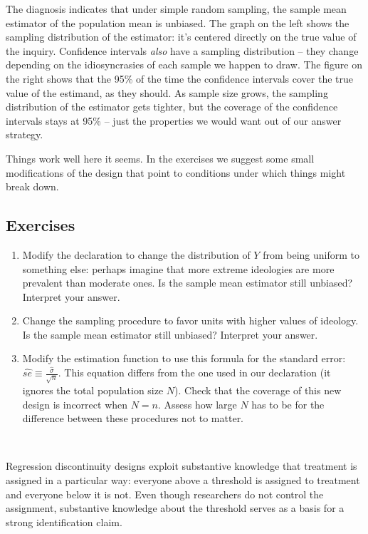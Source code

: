 \documentclass[11pt]{article}\usepackage[]{graphicx}\usepackage[]{color}
\begin{document}
The diagnosis indicates that under simple random sampling, the sample mean estimator of the population mean is unbiased. The graph on the left shows the sampling distribution of the estimator: it's centered directly on the true value of the inquiry. Confidence intervals {\it also} have a sampling distribution -- they change depending on the idiosyncrasies of each sample we happen to draw. The figure on the right shows that the 95\% of the time the confidence intervals cover the true value of the estimand, as they should. As sample size grows, the sampling distribution of the estimator gets tighter, but the coverage of the confidence intervals stays at 95\% -- just the properties we would want out of our answer strategy.

Things work well here it seems. In the exercises we suggest some small modifications of the design that point to conditions under which things might break down.


\subsection*{Exercises} 

\begin{enumerate}
\item Modify the declaration to change the distribution of $Y$ from being uniform to something else: perhaps imagine that more extreme ideologies are more prevalent than moderate ones. Is the sample mean estimator still unbiased? Interpret your answer.
\item Change the sampling procedure to favor units with higher values of ideology. Is the sample mean estimator still unbiased? Interpret your answer.
\item Modify the estimation function to use this formula for the standard error: $\widehat{se} \equiv \frac{\widehat\sigma}{\sqrt{n}}$. This equation differs from the one used in our declaration (it ignores the total population size $N$). Check that the coverage of this new design is incorrect when $N=n$. Assess how large $N$ has to be for the difference between these procedures not to matter. 
\end{enumerate}

\clearpage
 \\


\noindent Regression discontinuity designs exploit substantive knowledge that treatment is assigned in a particular way: everyone above a threshold is assigned to treatment and everyone below it is not. Even though researchers do not control the assignment, substantive knowledge about the threshold serves as a basis for a strong identification claim.
\end{document}
